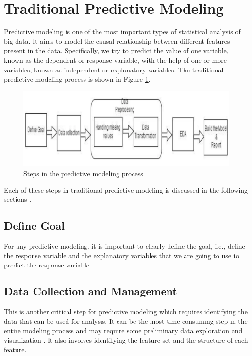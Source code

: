 \documentclass[sigconf]{acmart}
\begin{document}
\section{Traditional Predictive Modeling}

Predictive modeling is one of the most important types of statistical analysis of big data. It aims to model the causal relationship between different features present in the data. Specifically, we try to predict the value of one variable, known as the dependent or response variable, with the help of one or more variables, known as independent or explanatory variables. The traditional predictive modeling process is shown in Figure \ref{fig:Fig1}.

\begin{figure}[!ht]
  \centering\includegraphics[width=\columnwidth]{images/Fig1.png}
  \caption{Steps in the predictive modeling process \cite{part-reg}}
  \label{fig:Fig1}
\end{figure}

Each of these steps in traditional predictive modeling is discussed in the following sections \cite{part-reg}.

\subsection{Define Goal}
For any predictive modeling, it is important to clearly define the goal, i.e., define the response variable and the explanatory variables that we are going to use to predict the response variable \cite{part-reg}.
\subsection{Data Collection and Management} 
This is another critical step for predictive modeling which requires identifying the data that can be used for analysis. It can be the most time-consuming step in the entire modeling process and may require some preliminary data exploration and visualization \cite{part-reg}. It also involves identifying the feature set and the structure of each feature.
\end{document}
